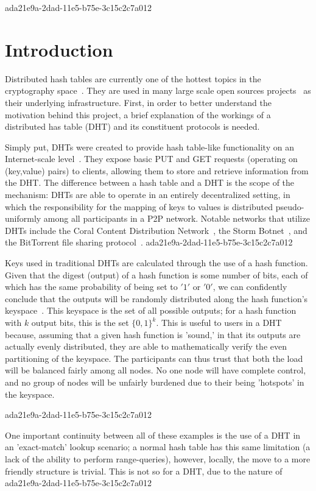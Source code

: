 \documentclass[12pt]{article}
\begin{document}
ada21e9a-2dad-11e5-b75e-3c15c2c7a012\section{Introduction}
\par Distributed hash tables are currently one of the hottest topics in the cryptography space~\cite{Stoica:2001dj,Rowstron:2001ea,Ratnasamy:2001wn}. They are used in many large scale open sources projects~\cite{Freitas:2013tb,Xu:2010vs,Perfitt:2010fh} as their underlying infrastructure. First, in order to better understand the motivation behind this project, a brief explanation of the workings of a distributed has table (DHT) and its constituent protocols is needed.

\par Simply put, DHTs were created to provide hash table-like functionality on an Internet-scale level~\cite{Ratnasamy:2001wn}. They expose basic PUT and GET requests (operating on (key,value) pairs) to clients, allowing them to store and retrieve information from the DHT. The difference between a hash table and a DHT is the scope of the mechanism: DHTs are able to operate in an entirely decentralized setting, in which the responsibility for the mapping of keys to values is distributed pseudo-uniformly among all participants in a P2P network. Notable networks that utilize DHTs include the Coral Content Distribution Network~\cite{Freedman:2004vb}, the Storm Botnet~\cite{Holz:2008uk}, and the BitTorrent file sharing protocol~\cite{Cohen:y1_8mBnw}.
ada21e9a-2dad-11e5-b75e-3c15c2c7a012
\par Keys used in traditional DHTs are calculated through the use of a hash function. Given that the digest (output) of a hash function is some number of bits, each of which has the same probability of being set to $'1'$ or $'0'$, we can confidently conclude that the outputs will be randomly distributed along the hash function's keyspace~. This keyspace is the set of all possible outputs; for a hash function with $k$ output bits, this is the set $\{0,1\}^k$. This is useful to users in a DHT because, assuming that a given hash function is 'sound,' in that its outputs are actually evenly distributed, they are able to mathematically verify the even partitioning of the keyspace. The participants can thus trust that both the load will be balanced fairly among all nodes. No one node will have complete control, and no group of nodes will be unfairly burdened due to their being 'hotspots' in the keyspace.~

ada21e9a-2dad-11e5-b75e-3c15c2c7a012\par One important continuity between all of these examples is the use of a DHT in an 'exact-match' lookup scenario; a normal hash table has this same limitation (a lack of the ability to perform range-queries), however, locally, the move to a more friendly structure is trivial. This is not so for a DHT, due to the nature of
\printbibliography
ada21e9a-2dad-11e5-b75e-3c15c2c7a012
\end{document}
